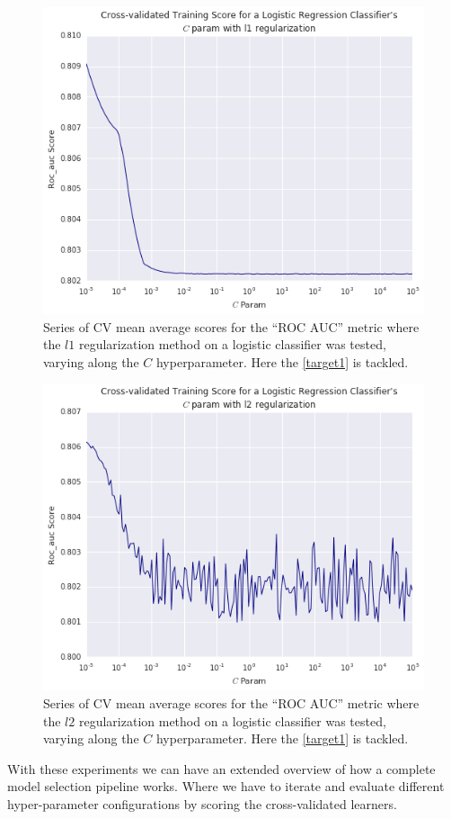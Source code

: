 \begin{figure}[h!]
	\begin{center}
		\includegraphics[width=0.7\linewidth]{figures/cross_validation/logreg_cv_regularization_l1_rocauc_series}
		\caption{Series of CV mean average scores for the ``ROC AUC'' metric where the $l1$ regularization method on a logistic classifier was tested, varying along the $C$ hyperparameter. 
			Here the \cref{target1} is tackled.}
		\label{fig:rocauc_logreg_cv_l1_regularized_comparison}
	\end{center}
\end{figure}



\begin{figure}[h!]
	\begin{center}
		 \includegraphics[width=0.7\linewidth]{figures/cross_validation/logreg_cv_regularization_l2_rocauc_series}
		\caption{Series of CV mean average scores for the ``ROC AUC'' metric where the $l2$ regularization method on a logistic classifier was tested, varying along the $C$ hyperparameter. 
			Here the \cref{target1} is tackled.}
		\label{fig:rocauc_logreg_cv_l2_regularized_comparison}
	\end{center}
\end{figure}


With these experiments we can have an extended overview of how a complete model selection pipeline works. Where we have to iterate and evaluate different hyper-parameter configurations by scoring the cross-validated learners.	